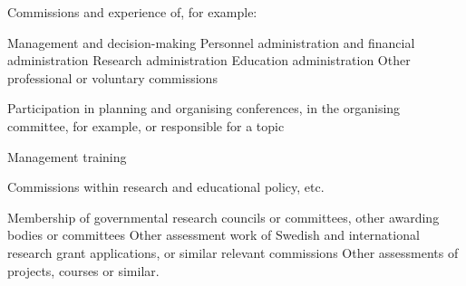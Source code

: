 Commissions and experience of, for example:

Management and decision-making
Personnel administration and financial administration
Research administration
Education administration
Other professional or voluntary commissions

Participation in planning and organising conferences, in the
organising committee, for example, or responsible for a topic

Management training

Commissions within research and educational policy, etc.

Membership of governmental research councils or committees, other
awarding bodies or committees Other assessment work of Swedish and
international research grant applications, or similar relevant
commissions Other assessments of projects, courses or similar.
